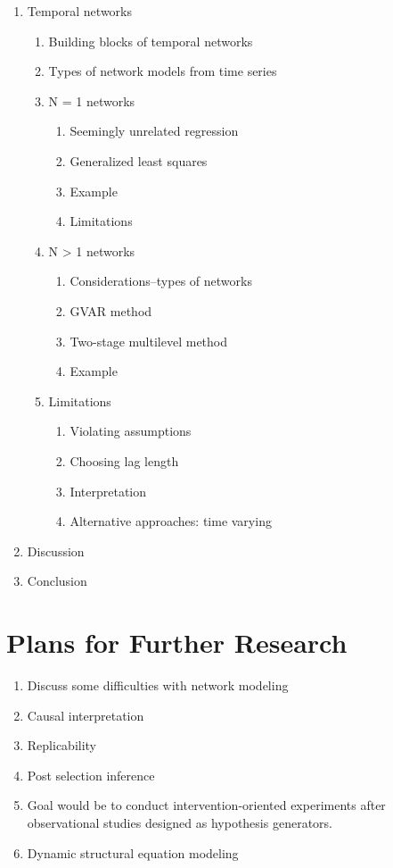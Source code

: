 \begin{enumerate}
\begin{enumerate}
\begin{enumerate}
            \item Uncertainty about estimation
        \end{enumerate}
    \end{enumerate}
    \item Temporal networks
    \begin{enumerate}
        \item Building blocks of temporal networks
        \item Types of network models from time series
        \item N = 1 networks
        \begin{enumerate}
            \item Seemingly unrelated regression
            \item Generalized least squares
            \item Example
            \item Limitations
        \end{enumerate}
        \item N > 1 networks
        \begin{enumerate}
            \item Considerations--types of networks
            \item GVAR method
            \item Two-stage multilevel method
            \item Example
        \end{enumerate}
        \item Limitations
        \begin{enumerate}
            \item Violating assumptions
            \item Choosing lag length
            \item Interpretation
            \item Alternative approaches: time varying
        \end{enumerate}
    \end{enumerate}
    \item Discussion
    \item Conclusion
\end{enumerate}


\chapter{Plans for Further Research}
\begin{enumerate}
    \item Discuss some difficulties with network modeling
    \item Causal interpretation
    \item Replicability
    \item Post selection inference
    \item Goal would be to conduct intervention-oriented experiments after observational studies designed as hypothesis generators.
    \item Dynamic structural equation modeling
\end{enumerate}
